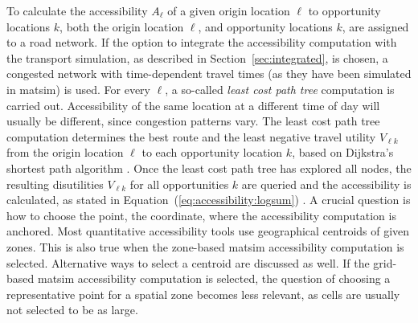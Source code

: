 To calculate the accessibility $A_\ell$ of a given origin location $\ell$ to opportunity locations $k$, both
the origin location $\ell$, and opportunity locations $k$, are assigned to a road network. If the option to
integrate the accessibility computation with the transport simulation, as described in Section~\ref{sec:integrated},
is chosen, a congested network with time-dependent travel times (as they have been simulated in \gls{matsim})
is used. For every $\ell$, a so-called \emph{least cost path tree} computation
\citep{LefebvreBalmer_unpub_STRC_2007} is carried out. Accessibility of the same location at a different
time of day will usually be different, since congestion patterns vary.
The least cost path tree computation determines the best route and the least negative travel
utility $V_{\ell k}$ from the origin location $\ell$ to each opportunity location $k$, based on Dijkstra's
shortest path algorithm \citep{Dijkstra_NM_1959}. Once the least cost path tree has explored all
nodes, the resulting disutilities $V_{\ell k}$ for all opportunities $k$ are queried and the accessibility
is calculated, as stated in Equation~(\ref{eq:accessibility:logsum}) \citep{NicolaiNagelHiResAccessibilityMethod}.
%
A crucial question is how to choose the point, \ie the coordinate, where the accessibility computation is
anchored. Most quantitative accessibility tools use geographical centroids of given zones. This is also
true when the zone-based \gls{matsim} accessibility computation is selected. Alternative ways to select
a centroid \citep[\eg land-use-based centroids;][]{BuettnerEtAl2010Erreichbarkeitsatlas} are discussed as
well. If the grid-based \gls{matsim} accessibility computation is selected, the question of choosing
a representative point for a spatial zone becomes less relevant, as cells are usually not selected to
be as large.


